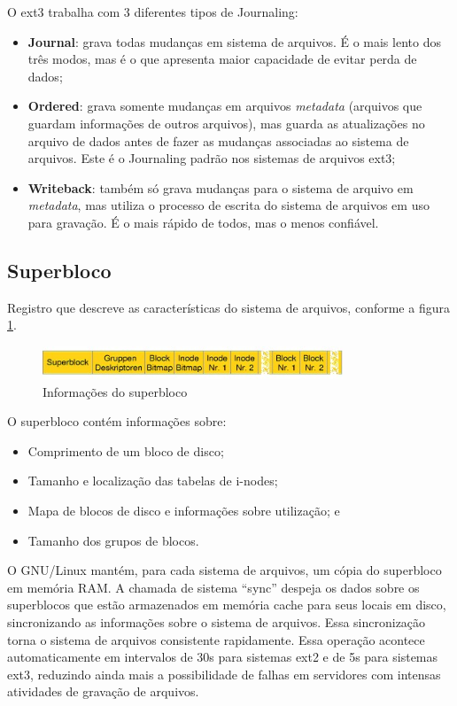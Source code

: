 O ext3 trabalha com 3 diferentes tipos de Journaling:

\begin{itemize}
	\item \textbf{Journal}: grava todas mudanças em sistema de arquivos. É o mais lento dos três modos, mas é o que apresenta maior capacidade de evitar perda de dados;
	\item \textbf{Ordered}: grava somente mudanças em arquivos \emph{metadata} (arquivos que guardam informações de outros arquivos), mas guarda as atualizações no arquivo de dados antes de fazer as mudanças associadas ao sistema de arquivos. Este é o Journaling padrão nos sistemas de arquivos ext3;
	\item \textbf{Writeback}: também só grava mudanças para o sistema de arquivo em \emph{metadata}, mas utiliza o processo de escrita do sistema de arquivos em uso para gravação. É o mais rápido de todos, mas o menos confiável.
\end{itemize}

\subsection{Superbloco}

Registro que descreve as características do sistema de arquivos, conforme a figura \ref{fig:superbloco}.

\begin{figure}
	\centering
	\includegraphics[width=0.8\textwidth]{sistemas_de_arquivos/fig/superbloco.jpg}
	\caption{Informações do superbloco}
	\label{fig:superbloco}
\end{figure}

O superbloco contém informações sobre:

\begin{itemize}
	\item Comprimento de um bloco de disco;
	\item Tamanho e localização das tabelas de i-nodes;
	\item Mapa de blocos de disco e informações sobre utilização; e
	\item Tamanho dos grupos de blocos.
\end{itemize}

O GNU/Linux mantém, para cada sistema de arquivos, um cópia do superbloco em memória RAM. A chamada de sistema ``sync'' despeja os dados sobre os superblocos que estão armazenados em memória cache para seus locais em disco, sincronizando as informações sobre o sistema de arquivos. Essa sincronização torna o sistema de arquivos consistente rapidamente. Essa operação acontece automaticamente em intervalos de 30s para sistemas ext2 e de 5s para sistemas ext3, reduzindo ainda mais a possibilidade de falhas em servidores com intensas atividades de gravação de arquivos.

